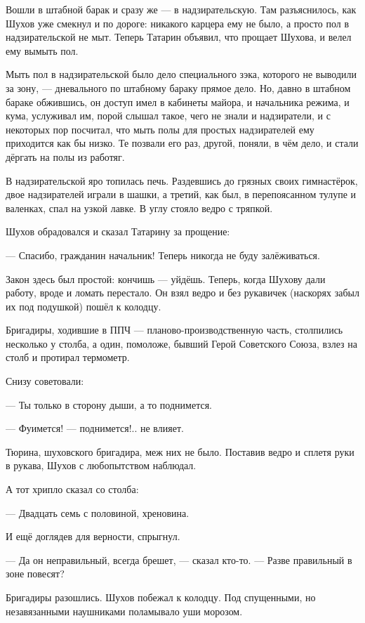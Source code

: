 Вошли в штабной барак и сразу же --- в надзирательскую. Там разъяснилось, как Шухов уже
смекнул и по дороге: никакого карцера ему не было, а просто пол в надзирательской не мыт.
Теперь Татарин объявил, что прощает Шухова, и велел ему вымыть пол.

Мыть пол в надзирательской было дело специального зэка, которого не выводили за зону, ---
дневального по штабному бараку прямое дело. Но, давно в штабном бараке обжившись, он доступ
имел в кабинеты майора, и начальника режима, и кума, услуживал им, порой слышал такое, чего не
знали и надзиратели, и с некоторых пор посчитал, что мыть полы для простых надзирателей ему
приходится как бы низко. Те позвали его раз, другой, поняли, в чём дело, и стали дёргать на
полы из работяг.

В надзирательской яро топилась печь. Раздевшись до грязных своих гимнастёрок, двое
надзирателей играли в шашки, а третий, как был, в перепоясанном тулупе и валенках, спал на
узкой лавке. В углу стояло ведро с тряпкой.

Шухов обрадовался и сказал Татарину за прощение:

--- Спасибо, гражданин начальник! Теперь никогда не буду залёживаться.

Закон здесь был простой: кончишь --- уйдёшь. Теперь, когда Шухову дали работу, вроде и ломать
перестало. Он взял ведро и без рукавичек (наскорях забыл их под подушкой) пошёл к колодцу.

Бригадиры, ходившие в ППЧ --- планово-производственную часть, столпились несколько у столба,
а один, помоложе, бывший Герой Советского Союза, взлез на столб и протирал термометр.

Снизу советовали:

--- Ты только в сторону дыши, а то поднимется.

--- Фуимется! --- поднимется!.. не влияет.

Тюрина, шуховского бригадира, меж них не было. Поставив ведро и сплетя руки в рукава, Шухов с
любопытством наблюдал.

А тот хрипло сказал со столба:

--- Двадцать семь с половиной, хреновина.

И ещё доглядев для верности, спрыгнул.

--- Да он неправильный, всегда брешет, --- сказал кто-то. --- Разве правильный в зоне повесят?

Бригадиры разошлись. Шухов побежал к колодцу. Под спущенными, но незавязанными наушниками
поламывало уши морозом.


